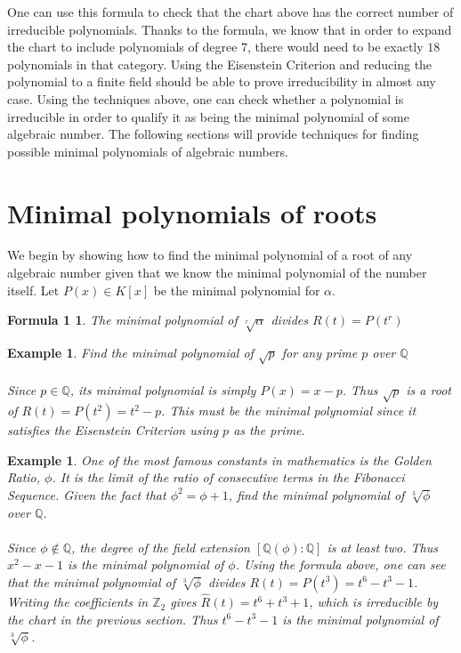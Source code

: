 \documentclass{article}
\newtheorem*{Definition: Sylvester Matrix}{Definition}
\newtheorem*{Definition: Resultant 1}{Definition 1}
\newtheorem*{Definition: Resultant 2}{Definition 2}
\newtheorem*{Theorem: Resultant proves shared roots}{Theorem 1}
\newtheorem*{Theorem: Minimal polynomial for beta}{Theorem 2}
\newtheorem*{Example: Sylvester Matrix Ex}{Example}
\newtheorem*{Theorem: Roots}{Theorem}
\newtheorem*{Corollary: Discriminant}{Corollary}
\newtheorem*{Theorem: Rational Root Theorem}{Theorem}
\newtheorem*{Corollary: Cubic Irreducibility}{Corollary}
\newtheorem*{Theorem: Eisenstein Criterion}{Theorem}
\newtheorem*{Theorem: mod p Test}{Theorem}
\newtheorem*{Theorem: Rabin's algorithm}{Theorem}
\newtheorem*{Theorem: gcd finite field}{Theorem}
\newtheorem*{Theorem: Gauss Irreducibles}{Theorem}
\newtheorem*{Theorem: Number of irreducibles}{Theorem}
\newtheorem*{Example: All irreducibles in Z_2}{Example}
\newtheorem*{Formula: Minimal polynomial for r root of a}{Formula 1}
\newtheorem*{Example: minimal polynomial for sqrt(p)}{Example}
\newtheorem*{Example: Golden Ratio}{Example}
\newtheorem*{Formula: Minimal polynomial for a+b}{Formula 2}
\newtheorem*{Example: 1 + sqrt(3)}{Example}
\newtheorem*{Example: cubic root of unity}{Example}
\newtheorem*{Formula: Minimal polynomial for a/b}{Formula 3}
\newtheorem*{Formula: Minimal polynomial for ab}{Formula 4}
\newtheorem*{Example: cubrt(4)/i+1}{Example}
\newtheorem*{Example: 5zeta}{Example}
\newtheorem*{Example: Wild one}{Example}
\begin{document}
One can use this formula to check that the chart above has the correct number of irreducible polynomials. Thanks to the formula, we know that in order to expand the chart to include polynomials of degree $7$, there would need to be exactly $18$ polynomials in that category. Using the Eisenstein Criterion and reducing the polynomial to a finite field should be able to prove irreducibility in almost any case. Using the techniques above, one can check whether a polynomial is irreducible in order to qualify it as being the minimal polynomial of some algebraic number. The following sections will provide techniques for finding possible minimal polynomials of algebraic numbers. 


\section{Minimal polynomials of roots}

We begin by showing how to find the minimal polynomial of a root of any algebraic number given that we know the minimal polynomial of the number itself. Let $P(x) \in K[x]$ be the minimal polynomial for $\alpha$. \\

\begin{Formula: Minimal polynomial for r root of a}
The minimal polynomial of $\sqrt[r]{\alpha}$ divides $R(t) =P(t^r)$
\end{Formula: Minimal polynomial for r root of a}

\begin{Example: minimal polynomial for sqrt(p)}
Find the minimal polynomial of $\sqrt{p}$ for any prime $p$ over $\mathbb{Q}$\\\\
Since $p \in \mathbb{Q}$, its minimal polynomial is simply $P(x) = x-p$. Thus  $\sqrt{p}$ is a root of $R(t) = P(t^2)= t^2 - p$. This must be the minimal polynomial since it satisfies the Eisenstein Criterion using $p$ as the prime. 
\end{Example: minimal polynomial for sqrt(p)}

\begin{Example: Golden Ratio}
One of the most famous constants in mathematics is the Golden Ratio, $\phi$. It is the limit of the ratio of consecutive terms in the Fibonacci Sequence. Given the fact that $\phi^2 = \phi + 1$, find the minimal polynomial of $\sqrt[3]{\phi}$ over $\mathbb{Q}$.\\\\
Since $\phi \notin \mathbb{Q}$, the degree of the field extension $[\mathbb{Q}(\phi) : \mathbb{Q}]$ is at least two. Thus $x^2-x-1$ is the minimal polynomial of $\phi$. Using the formula above, one can see that the minimal polynomial of  $\sqrt[3]{\phi}$ divides $R(t)=P(t^3)=t^6-t^3-1$. Writing the coefficients in $\mathbb{Z}_2$ gives $\widehat{R}(t)=t^6+t^3+1$, which is irreducible by the chart in the previous section. Thus $t^6-t^3-1$ is the minimal polynomial of $\sqrt[3]{\phi}$. 
\end{Example: Golden Ratio}
\end{document}
